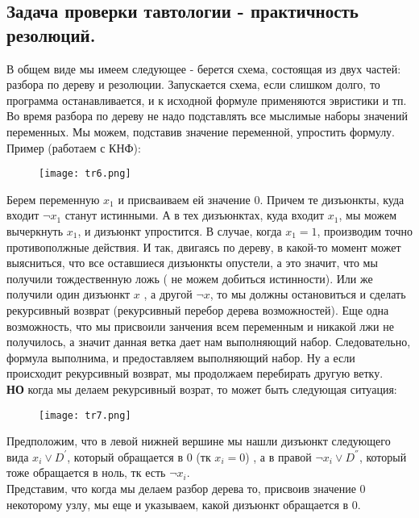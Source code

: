 \subsection{Задача проверки тавтологии - практичность резолюций.}
В общем виде мы имеем следующее - берется схема, состоящая из двух частей: разбора по дереву и резолюции. Запускается схема, если слишком долго, то программа останавливается, и к исходной формуле применяются эвристики и тп.\\
Во время разбора по дереву не надо подставлять все мыслимые наборы значений переменных. Мы можем, подставив значение переменной, упростить формулу.\\
\newpage
Пример (работаем с КНФ):\\
\begin{figure}[h!]
	\center\texttt{[image: tr6.png]}
\end{figure}
\newline
Берем переменную $x_1$ и присваиваем ей значение 0. Причем те дизъюнкты, куда входит $\neg x_1$ станут истинными. А в тех дизъюнктах, куда входит $ x_1$, мы можем вычеркнуть  $ x_1$, и дизъюнкт упростится. В случае, когда $x_1 = 1$, производим точно противополжные действия. И так, двигаясь по дереву, в какой-то момент может выясниться, что все оставшиеся дизъюнкты опустели, а это значит, что мы получили тождественную ложь ( не можем добиться истинности). Или же получили один дизъюнкт $ x$ , а другой $\neg x$, то мы должны остановиться и сделать рекурсивный возврат (рекурсивный перебор дерева возможностей). Еще одна возможность, что мы присвоили занчения всем переменным и никакой лжи не получилось, а значит данная ветка дает нам выполняющий набор. Следовательно, формула выполнима, и предоставляем выполняющий набор. Ну а если происходит рекурсивный возврат, мы продолжаем перебирать другую ветку.\\
\newpage
\textbf{НО} когда мы делаем рекурсивный возрат, то может быть следующая ситуация:
\begin{figure}[h!]
	\center\texttt{[image: tr7.png]}
\end{figure}
\newline
Предположим, что в левой нижней вершине мы нашли дизъюнкт следующего вида $x_i \vee D^{'}$, который обращается в 0 (тк $x_i=0$) , а в правой $\neg x_i \vee D^{''}$, который тоже обращается в ноль, тк есть $\neg x_i$.\\
Представим, что когда мы делаем разбор дерева то, присвоив значение 0 некоторому узлу, мы еще и указываем, какой дизъюнкт обращается в 0. \\
